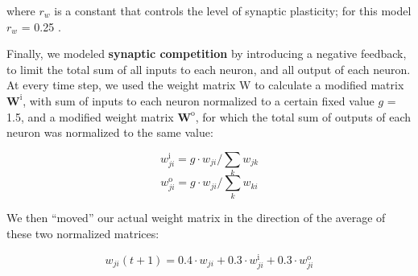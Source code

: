 \documentclass{article}
\begin{document}
where $r_w$ is a constant that controls the level of synaptic plasticity; for this model $r_w$ = 0.25 .

Finally, we modeled \textbf{synaptic competition} by introducing a negative feedback, to limit the total sum of all inputs to each neuron, and all output of each neuron. At every time step, we used the weight matrix W to calculate a modified matrix $\textbf{W}^\text{i}$, with sum of inputs to each neuron normalized to a certain fixed value $g$ = 1.5, and a modified weight matrix $\textbf{W}^\text{o}$, for which the total sum of outputs of each neuron was normalized to the same value: 

\[ w_{ji}^\text{i} = g \cdot w_{ji}/\sum_k{w_{jk}} \]
\[ w_{ji}^\text{o} = g \cdot w_{ji}/\sum_k{w_{ki}} \]

We then “moved” our actual weight matrix in the direction of the average of these two normalized matrices:

\[ w_{ji}(t+1) = 0.4 \cdot w_{ji} + 0.3 \cdot w^\text{i}_{ji} + 0.3 \cdot w^\text{o}_{ji} \]
\end{document}
